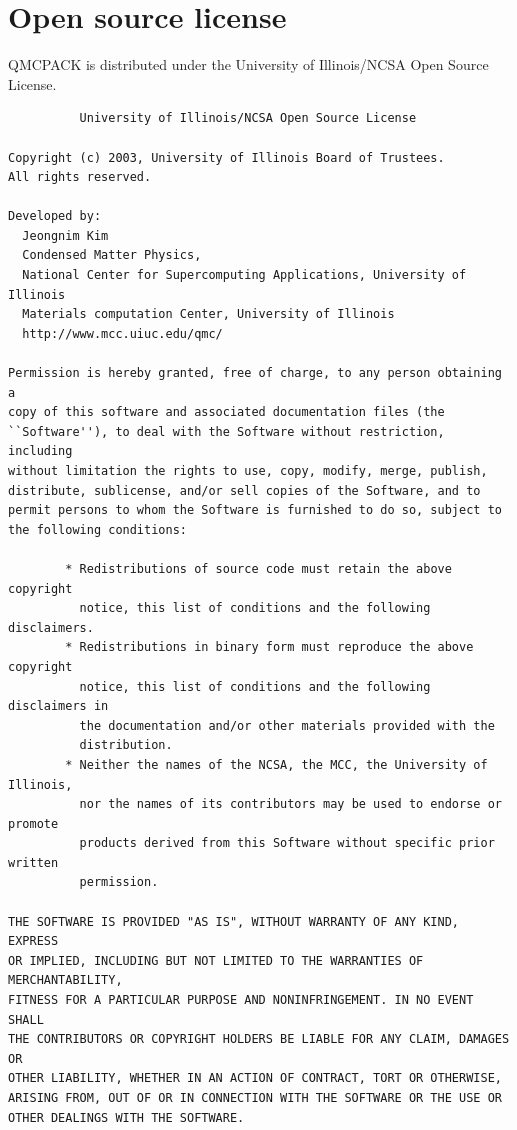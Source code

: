 \section{Open source license}
\label{sec:license}

QMCPACK is distributed under the University of Illinois/NCSA Open
Source License. 

\begin{verbatim}
		  University of Illinois/NCSA Open Source License

Copyright (c) 2003, University of Illinois Board of Trustees.
All rights reserved.

Developed by:   
  Jeongnim Kim
  Condensed Matter Physics,
  National Center for Supercomputing Applications, University of Illinois
  Materials computation Center, University of Illinois
  http://www.mcc.uiuc.edu/qmc/

Permission is hereby granted, free of charge, to any person obtaining a
copy of this software and associated documentation files (the
``Software''), to deal with the Software without restriction, including
without limitation the rights to use, copy, modify, merge, publish,
distribute, sublicense, and/or sell copies of the Software, and to
permit persons to whom the Software is furnished to do so, subject to
the following conditions:

        * Redistributions of source code must retain the above copyright 
          notice, this list of conditions and the following disclaimers.
        * Redistributions in binary form must reproduce the above copyright 
          notice, this list of conditions and the following disclaimers in 
          the documentation and/or other materials provided with the 
          distribution.
        * Neither the names of the NCSA, the MCC, the University of Illinois, 
          nor the names of its contributors may be used to endorse or promote 
          products derived from this Software without specific prior written 
          permission.

THE SOFTWARE IS PROVIDED "AS IS", WITHOUT WARRANTY OF ANY KIND, EXPRESS
OR IMPLIED, INCLUDING BUT NOT LIMITED TO THE WARRANTIES OF MERCHANTABILITY, 
FITNESS FOR A PARTICULAR PURPOSE AND NONINFRINGEMENT. IN NO EVENT SHALL 
THE CONTRIBUTORS OR COPYRIGHT HOLDERS BE LIABLE FOR ANY CLAIM, DAMAGES OR 
OTHER LIABILITY, WHETHER IN AN ACTION OF CONTRACT, TORT OR OTHERWISE, 
ARISING FROM, OUT OF OR IN CONNECTION WITH THE SOFTWARE OR THE USE OR 
OTHER DEALINGS WITH THE SOFTWARE.
\end{verbatim}

